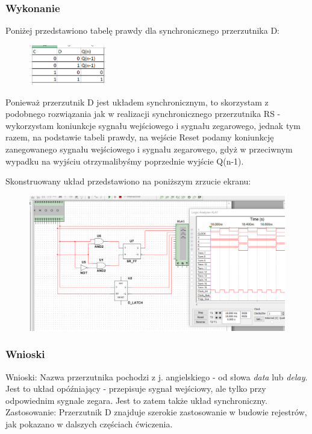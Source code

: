 \documentclass[12pt,a4paper]{article}
\begin{document}
\subsubsection{Wykonanie}
Poniżej przedstawiono tabelę prawdy dla synchronicznego przerzutnika D:

\begin{figure}[H]
\centering
\includegraphics[width=0.3\textwidth]{img/3dTruthTable}
\end{figure}

Ponieważ przerzutnik D jest układem synchronicznym, to skorzystam z podobnego rozwiązania jak w realizacji synchronicznego przerzutnika RS - wykorzystam koniunkcje sygnału wejściowego i sygnału zegarowego, jednak tym razem, na podstawie tabeli prawdy, na wejście Reset podamy koniunkcję zanegowanego sygnału wejściowego i sygnału zegarowego, gdyż w przeciwnym wypadku na wyjściu otrzymalibyśmy poprzednie wyjście Q(n-1).

Skonstruowany układ przedstawiono na poniższym zrzucie ekranu:

\begin{figure}[H]
\centering
\includegraphics[width=\textwidth]{img/3d}
\end{figure}

\subsubsection{Wnioski}

Wnioski: Nazwa przerzutnika pochodzi z j. angielskiego - od słowa \textit{data} lub \textit{delay}. Jest to układ opóźniający - przepisuje sygnał wejściowy, ale tylko przy odpowiednim sygnale zegara. Jest to zatem także układ synchroniczny.
\\
Zastosowanie: Przerzutnik D znajduje szerokie zastosowanie w budowie rejestrów, jak pokazano w dalszych częściach ćwiczenia.	
\end{document}
